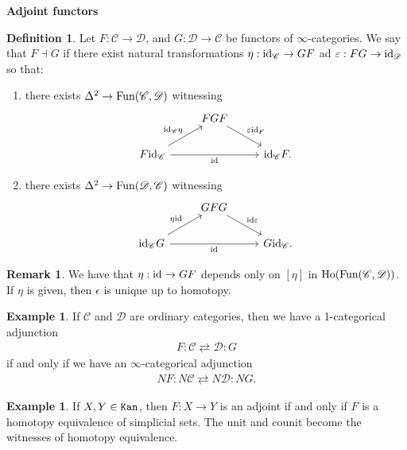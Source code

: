 \documentclass[12pt]{amsart}
\theoremstyle{definition}
\newtheorem{definition}[theorem]{Definition}
\newtheorem{example}[theorem]{Example}
\newtheorem{remark}[theorem]{Remark}
\begin{document}
\begin{center}
    \textbf{Adjoint functors}
\end{center}
\begin{definition} Let $F:\mathscr{C} \to \mathscr{D}$, and $G: \mathscr{D}\to \mathscr{C}$ be functors of $\infty$-categories. We say that $F\dashv G$ if there exist natural transformations $\eta: \text{id}_\mathscr{C} \to GF$ ad $\varepsilon: FG \to \text{id}_\mathscr{D}$ so that:
\begin{enumerate}
    \item there exists $\Delta^2 \to \text{Fun}(\mathscr{C},\mathscr{D})$ witnessing
\[ \begin{tikzcd}
    & FGF\ar[dr,"\epsilon\id_F" above right] & \\
    F\id_\mathscr{C}\ar[ur,"\id_\mathscr{C}\eta" above left]\ar[rr,"\id" below] &  & \id_\mathscr{C} F.
\end{tikzcd} \]
    \item there exists $\Delta^2 \to \text{Fun}(\mathscr{D},\mathscr{C})$ witnessing
    \[ \begin{tikzcd}
    & GFG\ar[dr,"\id \epsilon" above right] & \\
    \id_\mathscr{C}G\ar[ur,"\eta\id" above left]\ar[rr,"\id" below] &  & G\id_\mathscr{C}.
\end{tikzcd} \]
\end{enumerate}
\end{definition}

\begin{remark} We have that $\eta : \text{id} \to GF$ depends only on $[\eta]$ in $\text{Ho}(\text{Fun}(\mathscr{C},\mathscr{D}))$. If $\eta$ is given, then $\epsilon$ is unique up to homotopy.
\end{remark}

\begin{example} If $\mathscr{C}$ and $\mathscr{D}$ are ordinary categories, then we have a 1-categorical adjunction
\begin{align*}
    F: \mathscr{C} \rightleftarrows \mathscr{D}: G
\end{align*}
if and only if we have an $\infty$-categorical adjunction
\begin{align*}
    NF: N\mathscr{C} \rightleftarrows N\mathscr{D}: NG.
\end{align*}
\end{example}

\begin{example} If $X,Y\in\texttt{Kan}$, then $F: X \to Y$ is an adjoint if and only if $F$ is a homotopy equivalence of simplicial sets. The unit and counit become the witnesses of homotopy equivalence.
\end{example}
\end{document}
